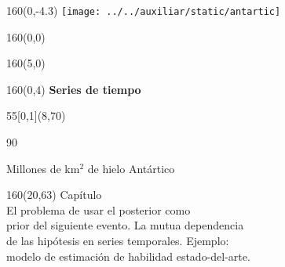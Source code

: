 \documentclass[shownotes,aspectratio=169]{beamer}
\newcounter{capitulo}
\newcommand{\unidad}{\thecapitulo \stepcounter{capitulo}}
\begin{document}
\begin{frame}
\begin{textblock}{160}(0,-4.3) \centering
\texttt{[image: ../../auxiliar/static/antartic]}
\end{textblock}

\begin{textblock}{160}(0,0) \centering
{}
\end{textblock}

\begin{textblock}{160}(5,0)
\end{textblock}


\begin{textblock}{160}(0,4) \centering
\LARGE \hspace{1cm} \textcolor{black!10}{\fontsize{22}{0}\selectfont \textbf{Series de tiempo}}
\end{textblock}


\begin{textblock}{55}[0,1](8,70)
\begin{turn}{90}
\parbox{6cm}{\footnotesize
\textcolor{black!10}{Millones de km$^2$ de hielo Antártico}}
\end{turn}
\end{textblock}


\begin{textblock}{160}(20,63)
\textcolor{black!5}{Capítulo \unidad \\ \small
El problema de usar el posterior como \\
prior del siguiente evento. La mutua dependencia \\
de las hipótesis en series temporales. Ejemplo:  \\
modelo de estimación de habilidad estado-del-arte. \\
}
\end{textblock}


\end{frame}
\end{document}
